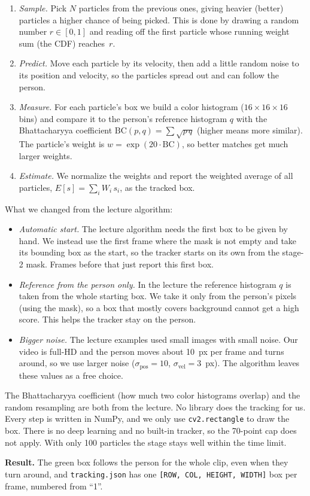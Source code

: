 \documentclass[11pt]{article}
\begin{document}
\begin{enumerate}[nosep]
    \item \emph{Sample.} Pick $N$ particles from the previous ones, giving heavier (better) particles
    a higher chance of being picked. This is done by drawing a random number $r\in[0,1]$ and reading
    off the first particle whose running weight sum (the CDF) reaches~$r$.
    \item \emph{Predict.} Move each particle by its velocity, then add a little random noise to its
    position and velocity, so the particles spread out and can follow the person.
    \item \emph{Measure.} For each particle's box we build a color histogram ($16\times16\times16$
    bins) and compare it to the person's reference histogram $q$ with the Bhattacharyya coefficient
    $\mathrm{BC}(p,q)=\sum\sqrt{p\,q}$ (higher means more similar). The particle's weight is
    $w=\exp(20\cdot\mathrm{BC})$, so better matches get much larger weights.
    \item \emph{Estimate.} We normalize the weights and report the weighted average of all particles,
    $E[s]=\sum_i W_i\,s_i$, as the tracked box.
\end{enumerate}

\noindent
What we changed from the lecture algorithm:

\begin{itemize}[nosep]
    \item \emph{Automatic start.} The lecture algorithm needs the first box to be given by hand. We
    instead use the first frame where the mask is not empty and take its bounding box as the start,
    so the tracker starts on its own from the stage-2 mask. Frames before that just report this first
    box.
    \item \emph{Reference from the person only.} In the lecture the reference histogram $q$ is taken
    from the whole starting box. We take it only from the person's pixels (using the mask), so a box
    that mostly covers background cannot get a high score. This helps the tracker stay on the person.
    \item \emph{Bigger noise.} The lecture examples used small images with small noise. Our video is
    full-HD and the person moves about 10~px per frame and turns around, so we use larger noise
    ($\sigma_\text{pos}=10$, $\sigma_\text{vel}=3$~px). The algorithm leaves these values as a free
    choice.
\end{itemize}

\noindent
The Bhattacharyya coefficient (how much two color histograms overlap) and the random resampling are
both from the lecture. No library does the tracking for us. Every step is written in
NumPy, and we only use \texttt{cv2.rectangle} to draw the box. There is no deep learning and no
built-in tracker, so the 70-point cap does not apply. With only 100 particles the stage stays well
within the time limit.

\medskip
\noindent
\textbf{Result.} The green box follows the person for the whole clip, even when they turn around, and
\texttt{tracking.json} has one \texttt{[ROW, COL, HEIGHT, WIDTH]} box per frame, numbered from ``1''.
\end{document}

